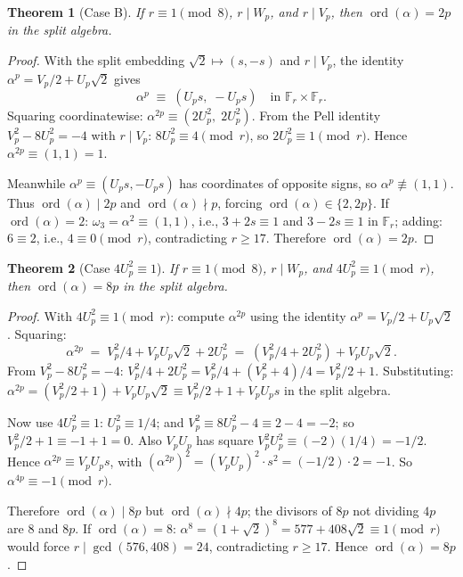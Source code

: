 \documentclass[11pt]{amsart}
\theoremstyle{plain}
\newtheorem{theorem}{Theorem}[section]
\theoremstyle{definition}
\theoremstyle{remark}
\numberwithin{equation}{section}
\newcommand{\ord}{\operatorname{ord}}
\newcommand{\F}{\mathbb{F}}
\begin{document}
\begin{theorem}[Case B]\label{thm:caseB}
If $r \equiv 1 \pmod 8$, $r \mid W_p$, and $r \mid V_p$, then $\ord(\alpha) = 2p$ in the split algebra.
\end{theorem}

\begin{proof}
With the split embedding $\sqrt 2 \mapsto (s, -s)$ and $r \mid V_p$, the identity $\alpha^p = V_p/2 + U_p \sqrt 2$ gives
\[
  \alpha^p \;\equiv\; (U_p s,\; -U_p s) \quad\text{in } \F_r \times \F_r.
\]
Squaring coordinatewise: $\alpha^{2p} \equiv (2 U_p^2,\; 2 U_p^2)$. From the Pell identity $V_p^2 - 8 U_p^2 = -4$ with $r \mid V_p$: $8 U_p^2 \equiv 4 \pmod r$, so $2 U_p^2 \equiv 1 \pmod r$. Hence $\alpha^{2p} \equiv (1, 1) = 1$.

Meanwhile $\alpha^p \equiv (U_p s, -U_p s)$ has coordinates of opposite signs, so $\alpha^p \not\equiv (1, 1)$. Thus $\ord(\alpha) \mid 2p$ and $\ord(\alpha) \nmid p$, forcing $\ord(\alpha) \in \{2, 2p\}$. If $\ord(\alpha) = 2$: $\omega_3 = \alpha^2 \equiv (1, 1)$, i.e., $3 + 2 s \equiv 1$ and $3 - 2 s \equiv 1$ in $\F_r$; adding: $6 \equiv 2$, i.e., $4 \equiv 0 \pmod r$, contradicting $r \geq 17$. Therefore $\ord(\alpha) = 2p$.
\end{proof}

\begin{theorem}[Case $4 U_p^2 \equiv 1$]\label{thm:caseC}
If $r \equiv 1 \pmod 8$, $r \mid W_p$, and $4 U_p^2 \equiv 1 \pmod r$, then $\ord(\alpha) = 8p$ in the split algebra.
\end{theorem}

\begin{proof}
With $4 U_p^2 \equiv 1 \pmod r$: compute $\alpha^{2p}$ using the identity $\alpha^p = V_p/2 + U_p \sqrt 2$. Squaring:
\[
  \alpha^{2p} \;=\; V_p^2/4 + V_p U_p \sqrt 2 + 2 U_p^2 \;=\; (V_p^2/4 + 2 U_p^2) + V_p U_p \sqrt 2.
\]
From $V_p^2 - 8 U_p^2 = -4$: $V_p^2/4 + 2 U_p^2 = V_p^2/4 + (V_p^2 + 4)/4 = V_p^2/2 + 1$. Substituting: $\alpha^{2p} = (V_p^2/2 + 1) + V_p U_p \sqrt 2 \equiv V_p^2/2 + 1 + V_p U_p s$ in the split algebra.

Now use $4 U_p^2 \equiv 1$: $U_p^2 \equiv 1/4$; and $V_p^2 \equiv 8 U_p^2 - 4 \equiv 2 - 4 = -2$; so $V_p^2/2 + 1 \equiv -1 + 1 = 0$. Also $V_p U_p$ has square $V_p^2 U_p^2 \equiv (-2)(1/4) = -1/2$. Hence $\alpha^{2p} \equiv V_p U_p s$, with $(\alpha^{2p})^2 = (V_p U_p)^2 \cdot s^2 = (-1/2) \cdot 2 = -1$. So $\alpha^{4p} \equiv -1 \pmod r$.

Therefore $\ord(\alpha) \mid 8p$ but $\ord(\alpha) \nmid 4p$; the divisors of $8p$ not dividing $4p$ are $8$ and $8p$. If $\ord(\alpha) = 8$: $\alpha^8 = (1 + \sqrt 2)^8 = 577 + 408\sqrt 2 \equiv 1 \pmod r$ would force $r \mid \gcd(576, 408) = 24$, contradicting $r \geq 17$. Hence $\ord(\alpha) = 8p$.
\end{proof}
\end{document}
